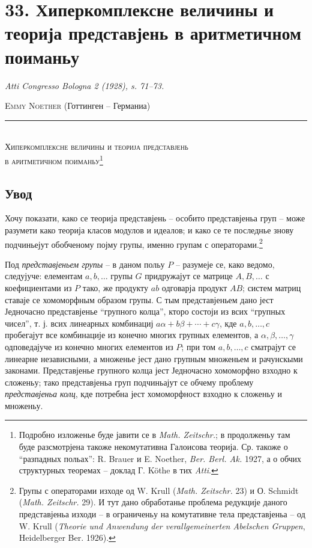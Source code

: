 ﻿\documentclass[11pt]{article}
\begin{document}
\section*{33. Хиперкомплексне величины и теорија представјень в аритметичном поиманьу}
\emph{Atti Congresso Bologna 2 (1928), s. 71--73.}

\begin{center}
\textsc{Emmy Noether} (Готтинген -- Германиа)\\[-0.1em]
\rule{3em}{0.4pt}\\[0.8em]
\textsc{Хиперкомплексне величины и теорија представјень}\\
\textsc{в аритметичном поиманьу}\footnote{Подробно изложенье буде јавити се в \emph{Math. Zeitschr.}; в продолженьу там буде разсмотрјена такоже некомутативна Галоисова теорија. Ср. такоже о “разпадных польах”: R. Brauer и E. Noether, \emph{Ber. Berl. Ak.} 1927, а о обчих структурных теоремах -- доклад Г. Köthe в тих \emph{Atti}.}
\end{center}

\subsection*{Увод}

Хочу показати, како се теорија представјень -- особито представјеньа груп -- може разумети како теорија класов модулов и идеалов; и како се те последнье знову подчиньејут обобченому појму групы, именно групам с операторами.\footnote{Групы с операторами изходе од W. Krull (\emph{Math. Zeitschr.} 23) и О. Schmidt (\emph{Math. Zeitschr.} 29). И тут дано обработанье проблема редукције даного представјеньа изходи -- в ограниченьу на комутативне тела представјеньа -- од W. Krull (\emph{Theorie und Anwendung der verallgemeinerten Abelschen Gruppen}, Heidelberger Ber. 1926).}

Под \emph{представјеньем групы} -- в даном польу $P$ -- разумеје се, како ведомо, следујуче: елементам $a,b,\ldots$ групы $G$ придружајут се матрице $A,B,\ldots$ с коефициентами из $P$ тако, же продукту $ab$ одговарја продукт $AB$; систем матриц ставаје се хомоморфным образом групы. С тым представјеньем дано јест Једночасно представјенье “групного колца”, кторо состоји из всих “групных чисел”, т. ј. всих линеарных комбинациј $a\alpha+b\beta+\cdots+c\gamma$, кде $a,b,\ldots,c$ пробегајут все комбинације из конечно многих групных елементов, а $\alpha,\beta,\ldots,\gamma$ одповедајуче из конечно многих елементов из $P$; при том $a,b,\ldots,c$ сматрајут се линеарне независными, а множенье јест дано групным множеньем и рачунскыми законами. Представјенье групного колца јест Једночасно хомоморфно взходно к сложеньу; тако представјеньа груп подчиньајут се обчему проблему \emph{представјеньа колц}, кде потребна јест хомоморфност взходно к сложеньу и множеньу.
\end{document}
